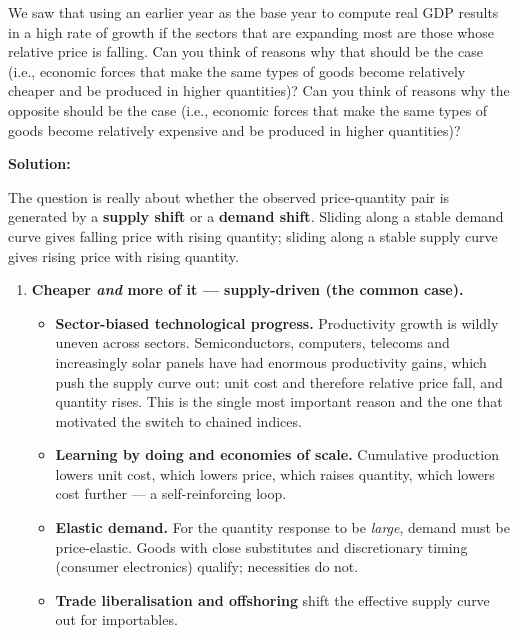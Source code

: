 \documentclass[12pt, letterpaper]{article}
\begin{document}
\begin{tcolorbox}[oddbox,title={Problem 1.5 \quad Changes in Relative Prices}]
\begin{tcolorbox}[questionbox]
We saw that using an earlier year as the base year to compute real GDP results in a high
rate of growth if the sectors that are expanding most are those whose relative price is
falling. Can you think of reasons why that should be the case (i.e., economic forces that
make the same types of goods become relatively cheaper and be produced in higher
quantities)? Can you think of reasons why the opposite should be the case (i.e., economic
forces that make the same types of goods become relatively expensive and be produced in
higher quantities)?
\end{tcolorbox}

\textbf{Solution:}

The question is really about whether the observed price-quantity pair is generated by a
\textbf{supply shift} or a \textbf{demand shift}. Sliding along a stable demand curve gives
falling price with rising quantity; sliding along a stable supply curve gives rising price
with rising quantity.

\begin{enumerate}

\item \textbf{Cheaper \emph{and} more of it --- supply-driven (the common case).}

\begin{itemize}[leftmargin=1.3em,itemsep=3pt,topsep=2pt]
\item \textbf{Sector-biased technological progress.} Productivity growth is wildly uneven
      across sectors. Semiconductors, computers, telecoms and increasingly solar panels have
      had enormous productivity gains, which push the supply curve out: unit cost and
      therefore relative price fall, and quantity rises. This is the single most important
      reason and the one that motivated the switch to chained indices.
\item \textbf{Learning by doing and economies of scale.} Cumulative production lowers unit
      cost, which lowers price, which raises quantity, which lowers cost further --- a
      self-reinforcing loop.
\item \textbf{Elastic demand.} For the quantity response to be \emph{large}, demand must be
      price-elastic. Goods with close substitutes and discretionary timing (consumer
      electronics) qualify; necessities do not.
\item \textbf{Trade liberalisation and offshoring} shift the effective supply curve out for
      importables.
\end{itemize}


\end{enumerate}
\end{tcolorbox}
\end{document}
